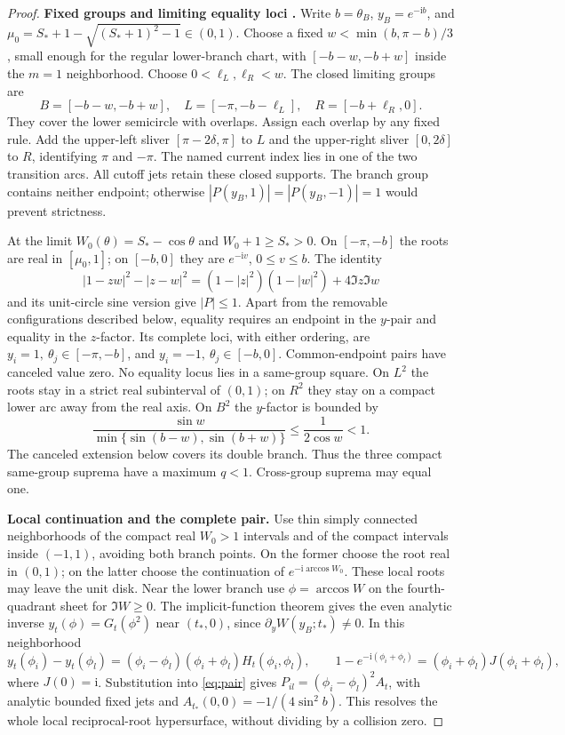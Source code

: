 \documentclass[11pt]{article}
\numberwithin{equation}{section}
\theoremstyle{definition}
\newcommand{\ii}{\mathrm i}
\begin{document}
\begin{proof}
\noindent\textbf{Fixed groups and limiting equality loci .}
Write \(b=\theta_B\), \(y_B=e^{-\ii b}\), and
\(\mu_0=S_*+1-\sqrt{(S_*+1)^2-1}\in(0,1)\).
Choose a fixed \(w<\min(b,\pi-b)/3\), small enough for the
regular lower-branch chart, with \([-b-w,-b+w]\) inside the
\(m=1\) neighborhood. Choose \(0<\ell_L,\ell_R<w\).
The closed limiting groups are
\[
 B=[-b-w,-b+w],\quad L=[-\pi,-b-\ell_L],\quad
 R=[-b+\ell_R,0].
\]
They cover the lower semicircle with overlaps. Assign each overlap
by any fixed rule. Add the upper-left sliver \([\pi-2\delta,\pi]\)
to \(L\) and the upper-right sliver \([0,2\delta]\) to \(R\),
identifying \(\pi\) and \(-\pi\). The named current index lies
in one of the two transition arcs. All cutoff jets retain these
closed supports. The branch group contains neither endpoint;
otherwise \(|P(y_B,1)|=|P(y_B,-1)|=1\) would prevent strictness.

At the limit \(W_0(\theta)=S_*-\cos\theta\) and
\(W_0+1\ge S_*>0\). On \([-\pi,-b]\) the roots are real
in \([\mu_0,1]\); on \([-b,0]\) they are \(e^{-\ii v}\),
\(0\le v\le b\). The identity
\[
 |1-zw|^2-|z-w|^2
 =(1-|z|^2)(1-|w|^2)+4\Im z\Im w
\]
and its unit-circle sine version give \(|P|\le1\).
Apart from the removable configurations described below, equality
requires an endpoint in the \(y\)-pair and equality in the
\(z\)-factor. Its complete loci, with either ordering, are
\(y_i=1,\ \theta_j\in[-\pi,-b]\), and
\(y_i=-1,\ \theta_j\in[-b,0]\). Common-endpoint pairs have
canceled value zero. No equality locus lies in a same-group square.
On \(L^2\) the roots stay in a strict real subinterval of \((0,1)\);
on \(R^2\) they stay on a compact lower arc away from the real axis.
On \(B^2\) the \(y\)-factor is bounded by
\[
 \frac{\sin w}{\min\{\sin(b-w),\sin(b+w)\}}
 \le\frac1{2\cos w}<1.
\]
The canceled extension below covers its double branch. Thus
the three compact same-group suprema have a maximum \(q<1\).
Cross-group suprema may equal one.

\par\smallskip\noindent\textbf{Local continuation and the complete pair.}
Use thin simply connected neighborhoods of the compact real
\(W_0>1\) intervals and of the compact intervals inside \((-1,1)\),
avoiding both branch points. On the former choose the root real
in \((0,1)\); on the latter choose the continuation of
\(e^{-\ii\arccos W_0}\). These local roots may leave the unit disk.
Near the lower branch use \(\phi=\arccos W\) on the
fourth-quadrant sheet for \(\Im W\ge0\).
The implicit-function theorem gives the even analytic inverse
\(y_t(\phi)=G_t(\phi^2)\) near \((t_*,0)\), since
\(\partial_yW(y_B;t_*)\ne0\). In this neighborhood
\[
 y_t(\phi_i)-y_t(\phi_l)
  =(\phi_i-\phi_l)(\phi_i+\phi_l)H_t(\phi_i,\phi_l),\qquad
 1-e^{-\ii(\phi_i+\phi_l)}=(\phi_i+\phi_l)J(\phi_i+\phi_l),
\]
where \(J(0)=\ii\). Substitution into \eqref{eq:pair} gives
\(P_{il}=(\phi_i-\phi_l)^2A_t\), with analytic bounded fixed
jets and \(A_{t_*}(0,0)=-1/(4\sin^2b)\).
This resolves the whole local reciprocal-root hypersurface,
without dividing by a collision zero.


\end{proof}
\end{document}

